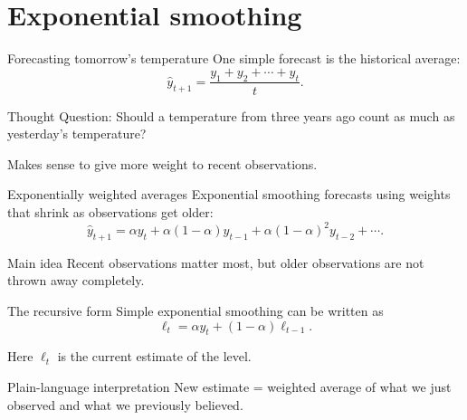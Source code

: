 \documentclass[aspectratio=169,11pt]{beamer}
\begin{document}
\section{Exponential smoothing}

\begin{frame}{Forecasting tomorrow's temperature}
One simple forecast is the historical average:
\[
\hat y_{t+1} = \frac{y_1+y_2+\cdots+y_t}{t}.
\]

\vspace{0.4cm}
\begin{block}{Thought Question:}
Should a temperature from three years ago count as much as yesterday's temperature?
\end{block}

\vspace{0.3cm}
Makes sense to give more weight to recent observations.
\end{frame}

\begin{frame}{Exponentially weighted averages}
Exponential smoothing forecasts using weights that shrink as observations get older:
\[
\hat y_{t+1}
=
\alpha y_t
+\alpha(1-\alpha)y_{t-1}
+\alpha(1-\alpha)^2y_{t-2}
+\cdots.
\]

\vspace{0.4cm}
\begin{block}{Main idea}
Recent observations matter most, but older observations are not thrown away completely.
\end{block}
\end{frame}

\begin{frame}{The recursive form}
Simple exponential smoothing can be written as
\[
\ell_t = \alpha y_t + (1-\alpha)\ell_{t-1}.
\]

\vspace{0.3cm}
Here \(\ell_t\) is the current estimate of the level.

\vspace{0.4cm}
\begin{block}{Plain-language interpretation}
New estimate = weighted average of what we just observed and what we previously believed.
\end{block}
\end{frame}
\end{document}

